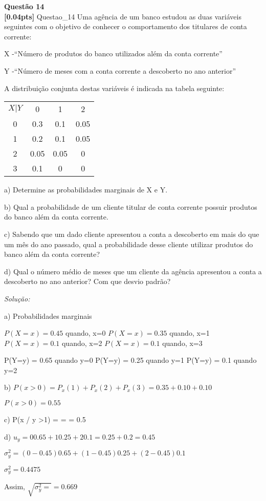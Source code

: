 \documentclass{article}
\newenvironment{problem}[2][Questão]
    { \begin{mdframed}[backgroundcolor=gray!20] \textbf{#1 #2} \\}
    {  \end{mdframed}}
\newenvironment{solution}
    {\textit{Solução:}}
    {}
\begin{document}
\begin{problem}{14}
\textbf{[0.04pts]} Questao\_14 Uma  agência  de  um  banco  estudou  as  duas  variáveis  seguintes  com  o  objetivo  de conhecer o comportamento dos titulares de conta corrente: 

X -“Número de produtos do banco utilizados além da conta corrente” 

Y -“Número de meses com a conta corrente a descoberto no ano anterior” 

A distribuição conjunta destas variáveis é indicada na tabela seguinte: 

\begin{center}
\begin{tabular}{ |c|c|c|c|}
\hline

$X|Y$ & 0 & 1 & 2  \\
0 & 0.3 & 0.1 & 0.05 \\
1 & 0.2 & 0.1 & 0.05 \\
2 & 0.05 & 0.05 & 0 \\
3 & 0.1 & 0 & 0 \\

 \hline
\end{tabular}
\end{center}

a) Determine as probabilidades marginais de X e Y.

b) Qual  a  probabilidade  de  um  cliente  titular  de  conta  corrente  possuir  produtos  do banco além da conta corrente.

c) Sabendo  que  um  dado  cliente  apresentou  a  conta  a  descoberto  em  mais  do  que  um mês do ano passado, qual a probabilidade desse cliente utilizar produtos do banco além da conta corrente?

d) Qual  o  número  médio  de  meses  que  um  cliente  da  agência  apresentou  a  conta  a descoberto no ano anterior? Com que desvio padrão?

\end{problem}

\begin{solution}

a) Probabilidades marginais

$P(X=x) = 0.45$ quando, x=0
$P(X=x) = 0.35$ quando, x=1
$P(X=x) = 0.1$  quando, x=2
$P(X=x) = 0.1$  quando, x=3

P(Y=y) = 0.65 quando y=0
P(Y=y) = 0.25 quando y=1
P(Y=y) = 0.1 quando y=2

b) $P(x>0) = P_{x}(1) + P_{x}(2) + P_{x}(3) = 0.35 + 0.10 + 0.10$

$P(x>0) = 0.55$

c) P(x  / y >1) =  =  = 0.5

d) $u_{y} = 0 0.65 + 1 0.25 + 2 0.1 = 0.25 + 0.2 = 0.45$

$\sigma_{y}^{2} = (0 - 0.45) 0.65 + (1-0.45) 0.25 + (2-0.45) 0.1$

$\sigma_{y}^{2} = 0.4475$

Assim, $\sqrt{\sigma_{y}^{2} =} = 0.669$


\end{solution}
\end{document}
